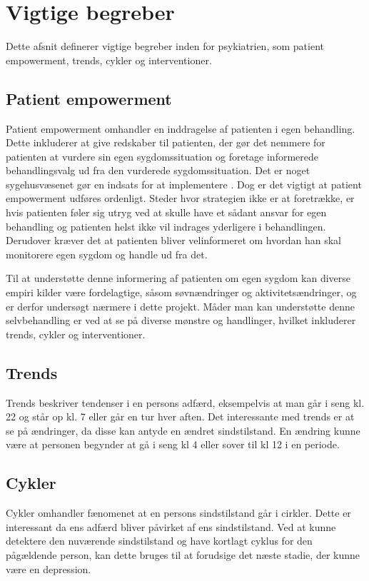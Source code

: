 \section{Vigtige begreber}
Dette afsnit definerer vigtige begreber inden for psykiatrien, som patient empowerment, trends, cykler og interventioner.

\subsection{Patient empowerment}\label{sec:patientempowerment}
Patient empowerment omhandler en inddragelse af patienten i egen behandling.
Dette inkluderer at give redskaber til patienten, der gør det nemmere for patienten at vurdere sin egen sygdomssituation og foretage informerede behandlingsvalg ud fra den vurderede sygdomssituation.
Det er noget sygehusvæsenet gør en indsats for at implementere \citep{misc:patientpowerhovedstaden}.
Dog er det vigtigt at patient empowerment udføres ordenligt.
Steder hvor strategien ikke er at foretrække, er hvis patienten føler sig utryg ved at skulle have et sådant ansvar for egen behandling og patienten helst ikke vil indrages yderligere i behandlingen.
Derudover kræver det at patienten bliver velinformeret om hvordan han skal monitorere egen sygdom og handle ud fra det.

Til at understøtte denne informering af patienten om egen sygdom kan diverse empiri kilder være fordelagtige, såsom søvnændringer og aktivitetsændringer\citep{misc:jorgen-aagaard}, og er derfor undersøgt nærmere i dette projekt.
Måder man kan understøtte denne selvbehandling er ved at se på diverse mønstre og handlinger, hvilket inkluderer trends, cykler og interventioner.

\subsection{Trends}
Trends beskriver tendenser i en persons adfærd, eksempelvis at man går i seng kl. 22 og står op kl. 7 eller går en tur hver aften.
Det interessante med trends er at se på ændringer, da disse kan antyde en ændret sindstilstand.
En ændring kunne være at personen begynder at gå i seng kl 4 eller sover til kl 12 i en periode.

\subsection{Cykler}
Cykler omhandler fænomenet at en persons sindstilstand går i cirkler.
Dette er interessant da ens adfærd bliver påvirket af ens sindstilstand.
Ved at kunne detektere den nuværende sindstilstand og have kortlagt cyklus for den pågældende person, kan dette bruges til at forudsige det næste stadie, der kunne være en depression.

